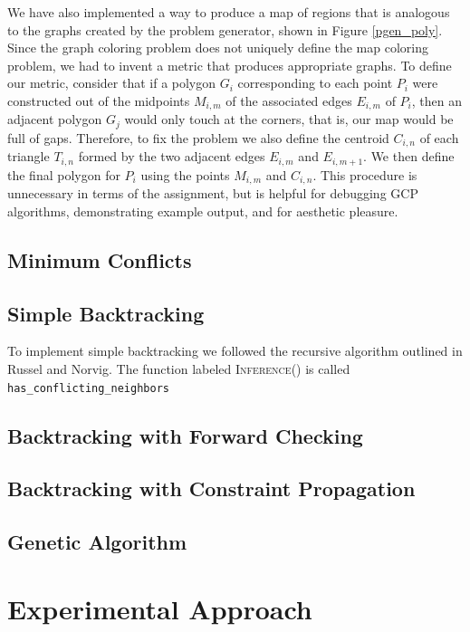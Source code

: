\documentclass{article}
\begin{document}
		We have also implemented a way to produce a map of regions that is analogous to the graphs created by the problem generator, shown in Figure \ref{pgen_poly}.  
		Since the graph coloring problem does not uniquely define the map coloring problem, we had to invent a metric that produces appropriate graphs. To define our metric, consider that if a polygon $G_i$ corresponding to each point $P_i$ were constructed out of the midpoints $M_{i,m}$ of the associated edges $E_{i,m}$ of $P_i$, then an adjacent polygon $G_j$ would only touch at the corners, that is, our map would be full of gaps. Therefore, to fix the problem we also define the centroid $C_{i,n}$ of each triangle $T_{i,n}$ formed by the two adjacent edges $E_{i,m}$ and $E_{i,m+1}$. We then define the final polygon for $P_i$ using the points $M_{i,m}$ and $C_{i,n}$. This procedure is unnecessary in terms of the assignment, but is helpful for debugging GCP algorithms, demonstrating example output, and for aesthetic pleasure.
		
	\subsection{Minimum Conflicts}
	
	\subsection{Simple Backtracking}
	To implement simple backtracking we followed the recursive algorithm outlined in Russel and Norvig\cite{ai}. The function labeled \textsc{Inference}() is called \texttt{has\_conflicting\_neighbors}
	
	\subsection{Backtracking with Forward Checking}
	
	\subsection{Backtracking with Constraint Propagation}
	
	\subsection{Genetic Algorithm}
	
\section{Experimental Approach}
\end{document}
